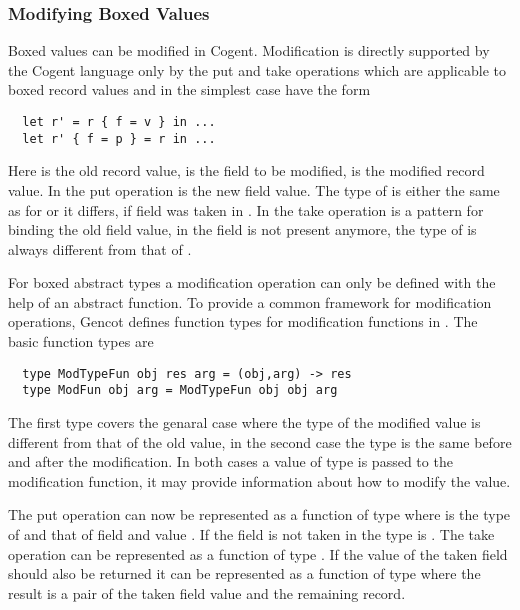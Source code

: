 \subsubsection{Modifying Boxed Values}

Boxed values can be modified in Cogent. Modification is directly supported by the Cogent language only by the put
and take operations which are applicable to boxed record values and in the simplest case have the form
\begin{verbatim}
  let r' = r { f = v } in ...
  let r' { f = p } = r in ...
\end{verbatim}
Here  is the old record value,  is the field to be modified,  is the modified record value.
In the put operation  is the new field value. The type of  is either the same as for  or it
differs, if field  was taken in . In the take operation  is a pattern for binding the old 
field value, in  the field is not present anymore, the type of  is always different from that of .

For boxed abstract types a modification operation can only be defined with the help of an abstract function.
To provide a common framework for modification operations, Gencot defines function types for modification functions 
in . The basic function types are
\begin{verbatim}
  type ModTypeFun obj res arg = (obj,arg) -> res
  type ModFun obj arg = ModTypeFun obj obj arg
\end{verbatim}
The first type covers the genaral case where the type of the modified value is different from that of the old value, in the second
case the type is the same before and after the modification. In both cases a value of type  is passed to the modification
function, it may provide information about how to modify the value. 

The put operation can now be represented as a function of type  where  is the type of
 and  that of field  and value . If the field is not taken in  the type is .
The take operation can be represented as a function of type . If the value of the taken
field should also be returned it can be represented as a function of type  where the result
is a pair of the taken field value and the remaining record.

